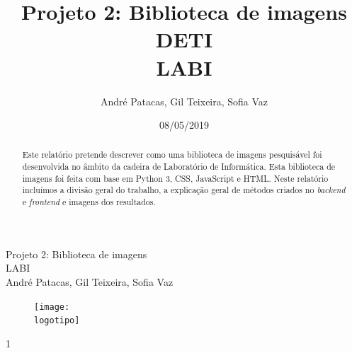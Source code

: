 \documentclass{report}
\begin{document}
%
\def\titulo{Projeto 2: Biblioteca de imagens}
\def\data{08/05/2019}
\def\autores{André Patacas, Gil Teixeira, Sofia Vaz}
\def\autorescontactos{(93357) andrepatacas@ua.pt, (88194) gilteixeira@ua.pt, (92968) sofiateixeiravaz@ua.pt}
\def\versao{1}
\def\departamento{DETI}
\def\empresa{LABI}
\def\logotipo{ua.pdf}

%
%
\begin{titlepage}

\begin{center}
\centering
%
\vspace*{50mm}
%
{\Huge \titulo}\\ 
%
\vspace{10mm}
%
{\Large \empresa}\\
%
\vspace{10mm}
%
{\large \autores}\\ 
%
\vspace{30mm}
%
\begin{figure}[h]
\centering
\texttt{[image: \\logotipo]}
\end{figure}
%
\vspace{30mm}
\end{center}
%
\begin{flushright}
\versao
\end{flushright}
\end{titlepage}

\title{%
{\Huge\textbf{\titulo}}\\
{\Large \departamento\\ \empresa}
}
%
\author{%
    \autores 
}
%
\date{\data}
%
\maketitle



\begin{abstract}
Este relatório pretende descrever como uma biblioteca de imagens pesquisável foi desenvolvida no âmbito da cadeira de Laboratório de Informática. Esta biblioteca de imagens foi feita com base em Python 3, \ac{CSS}, JavaScript e \ac{HTML}. Neste relatório incluímos a divisão geral do trabalho, a explicação geral de métodos criados no \textit{backend} e \textit{frontend} e imagens dos resultados. 
\end{abstract}

\end{document}
